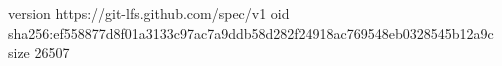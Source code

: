 version https://git-lfs.github.com/spec/v1
oid sha256:ef558877d8f01a3133c97ac7a9ddb58d282f24918ac769548eb0328545b12a9c
size 26507
